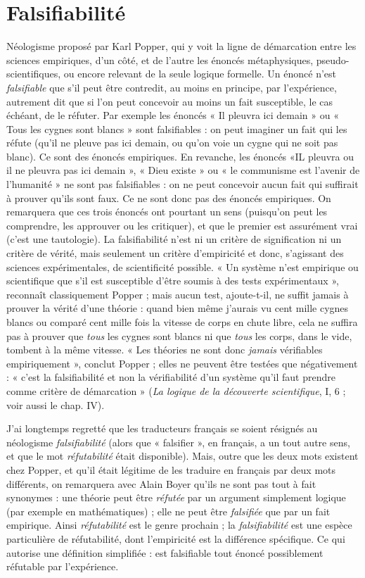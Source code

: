 \section{Falsifiabilité}
Néologisme proposé par Karl Popper, qui y voit la ligne
de démarcation entre les sciences empiriques, d’un côté,
et de l’autre les énoncés métaphysiques, pseudo-scientifiques, ou encore relevant
de la seule logique formelle. Un énoncé n’est {\it falsifiable} que s’il peut être
contredit, au moins en principe, par l’expérience, autrement dit que si l’on peut
concevoir au moins un fait susceptible, le cas échéant, de le réfuter. Par
exemple les énoncés « Il pleuvra ici demain » ou « Tous les cygnes sont blancs »
sont falsifiables : on peut imaginer un fait qui les réfute (qu’il ne pleuve pas ici
demain, ou qu’on voie un cygne qui ne soit pas blanc). Ce sont des énoncés
empiriques. En revanche, les énoncés «IL pleuvra ou il ne pleuvra pas ici
demain », « Dieu existe » ou « le communisme est l’avenir de l’humanité » ne
sont pas falsifiables : on ne peut concevoir aucun fait qui suffirait à prouver
qu'ils sont faux. Ce ne sont donc pas des énoncés empiriques. On remarquera
que ces trois énoncés ont pourtant un sens (puisqu’on peut les comprendre, les
approuver ou les critiquer), et que le premier est assurément vrai (c'est une
tautologie). La falsifiabilité n’est ni un critère de signification ni un critère de
vérité, mais seulement un critère d’empiricité et donc, s'agissant des sciences
expérimentales, de scientificité possible. « Un système n’est empirique ou scientifique
que s’il est susceptible d’être soumis à des tests expérimentaux », reconnaît
classiquement Popper ; mais aucun test, ajoute-t-il, ne suffit jamais à
prouver la vérité d’une théorie : quand bien même j'aurais vu cent mille cygnes
blancs ou comparé cent mille fois la vitesse de corps en chute libre, cela ne suffira
pas à prouver que {\it tous} les cygnes sont blancs ni que {\it tous} les corps, dans le
vide, tombent à la même vitesse. « Les théories ne sont donc {\it jamais} vérifiables
empiriquement », conclut Popper ; elles ne peuvent être testées que négativement :
« c’est la falsifiabilité et non la vérifiabilité d’un système qu’il faut
prendre comme critère de démarcation » ({\it La logique de la découverte scientifique},
I, 6 ; voir aussi le chap. IV).

J'ai longtemps regretté que les traducteurs français se soient résignés au
néologisme {\it falsifiabilité} (alors que « falsifier », en français, a un tout autre sens,
et que le mot {\it réfutabilité} était disponible). Mais, outre que les deux mots existent
chez Popper, et qu’il était légitime de les traduire en français par deux
mots différents, on remarquera avec Alain Boyer qu’ils ne sont pas tout à fait
synonymes : une théorie peut être {\it réfutée} par un argument simplement logique
(par exemple en mathématiques) ; elle ne peut être {\it falsifiée} que par un fait
empirique. Ainsi {\it réfutabilité} est le genre prochain ; la {\it falsifiabilité} est une espèce
particulière de réfutabilité, dont l’empiricité est la différence spécifique. Ce qui
autorise une définition simplifiée : est falsifiable tout énoncé possiblement
réfutable par l’expérience.

